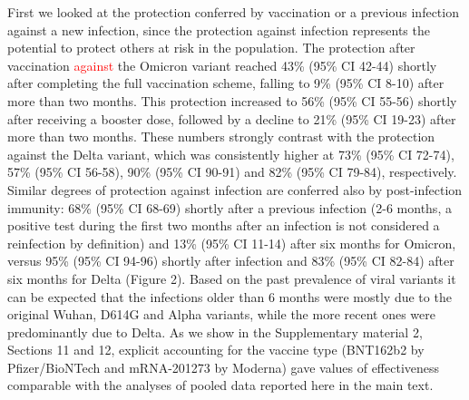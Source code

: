 \documentclass[a4paper,12pt]{article}
\def\figIalone{2}
\newcommand{\new}[1]{\textcolor{red}{#1}}
\begin{document}
First we looked at the protection conferred by vaccination or a previous infection against a new infection, since the protection against infection represents the potential to protect others at risk in the population. The protection after vaccination \new{against} the Omicron variant reached 43\% (95\% CI 42-44) shortly after completing the full vaccination scheme, falling to 9\% (95\% CI 8-10) after more than two months. This protection increased to 56\% (95\% CI 55-56) shortly after receiving a booster dose, followed by a decline to 21\% (95\% CI 19-23) after more than two months. These numbers strongly contrast with the protection against the Delta variant, which was consistently higher at 73\% (95\% CI 72-74), 57\% (95\% CI 56-58), 90\% (95\% CI 90-91) and 82\% (95\% CI 79-84), respectively. Similar degrees of protection against infection are conferred also by post-infection immunity: 68\% (95\% CI 68-69) shortly after a previous infection (2-6 months, a positive test during the first two months after an infection is not considered a reinfection by definition) and 13\% (95\% CI 11-14) after six months for Omicron, versus 95\% (95\% CI 94-96) shortly after infection and 83\% (95\% CI 82-84) after six months for Delta (Figure \figIalone). Based on the past prevalence of viral variants it can be expected that the infections older than 6 months were mostly due to the original Wuhan, D614G and Alpha variants, while the more recent ones were predominantly due to Delta. As we show in the Supplementary material 2, Sections 11 and 12, explicit accounting for the vaccine type (BNT162b2 by Pfizer/BioNTech and mRNA-201273 by Moderna) gave values of effectiveness comparable with the analyses of pooled data reported here in the main text.   
\end{document}
